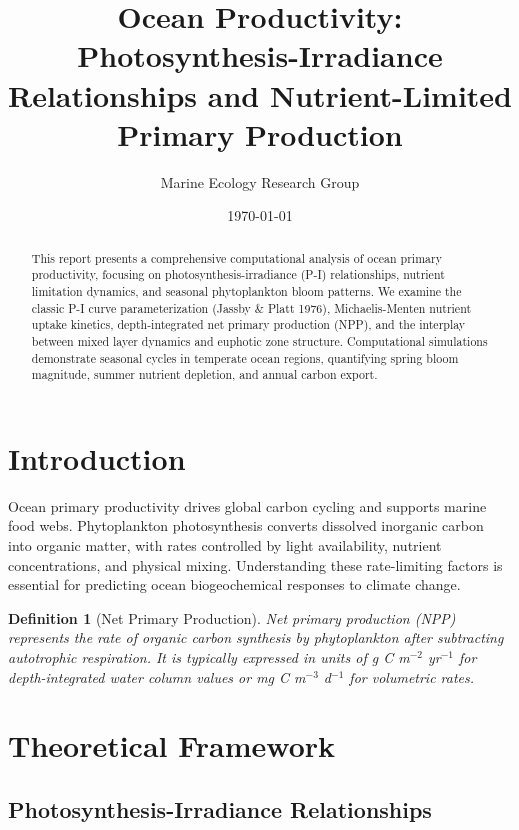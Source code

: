 \documentclass[a4paper, 11pt]{article}
\title{Ocean Productivity: Photosynthesis-Irradiance Relationships and Nutrient-Limited Primary Production}
\author{Marine Ecology Research Group}
\date{\today}
\newtheorem{definition}{Definition}[section]
\begin{document}
\maketitle

\begin{abstract}
This report presents a comprehensive computational analysis of ocean primary productivity,
focusing on photosynthesis-irradiance (P-I) relationships, nutrient limitation dynamics,
and seasonal phytoplankton bloom patterns. We examine the classic P-I curve parameterization
(Jassby \& Platt 1976), Michaelis-Menten nutrient uptake kinetics, depth-integrated net
primary production (NPP), and the interplay between mixed layer dynamics and euphotic zone
structure. Computational simulations demonstrate seasonal cycles in temperate ocean regions,
quantifying spring bloom magnitude, summer nutrient depletion, and annual carbon export.
\end{abstract}

\section{Introduction}

Ocean primary productivity drives global carbon cycling and supports marine food webs.
Phytoplankton photosynthesis converts dissolved inorganic carbon into organic matter, with
rates controlled by light availability, nutrient concentrations, and physical mixing. Understanding
these rate-limiting factors is essential for predicting ocean biogeochemical responses to climate change.

\begin{definition}[Net Primary Production]
Net primary production (NPP) represents the rate of organic carbon synthesis by phytoplankton
after subtracting autotrophic respiration. It is typically expressed in units of g C m$^{-2}$ yr$^{-1}$
for depth-integrated water column values or mg C m$^{-3}$ d$^{-1}$ for volumetric rates.
\end{definition}

\section{Theoretical Framework}

\subsection{Photosynthesis-Irradiance Relationships}
\end{document}
